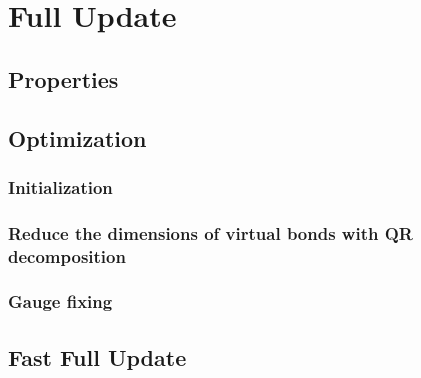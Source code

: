 \chapter{Full Update}
\label{chapter:fupdate}

\section{Properties}
\label{fupdateproperties}

\section{Optimization}
\subsection{Initialization}
\label{optfupdateint}

\subsection{Reduce the dimensions of virtual bonds with QR decomposition}
\label{optfupdateqr}

\subsection{Gauge fixing}
\label{optfupdatefix}

\section{Fast Full Update}
\label{ffupdate}
